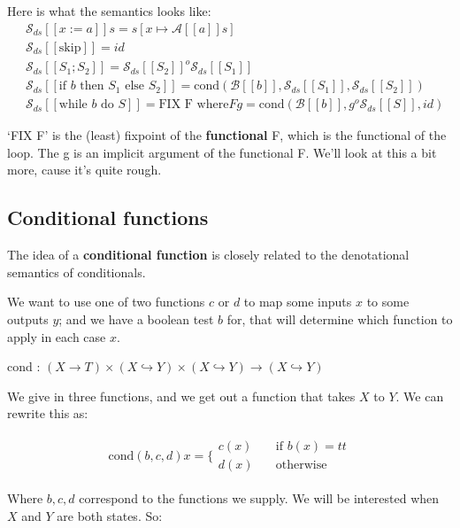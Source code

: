 \documentclass[11pt,a4paper,titlepage,dvipsnames,cmyk]{scrartcl}
\newcommand\pfun{\hookrightarrow}
\begin{document}
Here is what the semantics looks like:
\begin{align*}
    &\mathcal{S}_{ds} [\![x:=a]\!] s = s[x \mapsto \mathcal{A}[\![a]\!]s]
    \\
    &\mathcal{S}_{ds}[\![\text{skip}]\!] = id \\
    &\mathcal{S}_{ds}[\![S_1;S_2]\!] =
    \mathcal{S}_{ds}[\![S_2]\!]^o\mathcal{S}_{ds}[\![S_1]\!] \\
    &\mathcal{S}_{ds}[\![\text{if } b \text{ then } S_1 \text{ else }
    S_2]\!] =
    \text{cond}(\mathcal{B}[\![b]\!],\mathcal{S}_{ds}[\![S_1]\!],\mathcal{S}_{ds}[\![S_2]\!]) \\
    &\mathcal{S}_{ds}[\![\text{while } b \text{ do } S]\!] = \text{FIX F
    where} F g =
    \text{cond}(\mathcal{B}[\![b]\!],g^o\mathcal{S}_{ds}[\![S]\!],id)
\end{align*}

`FIX F' is the (least) fixpoint of the \textbf{functional} F, which is the
functional of the loop. The g is an implicit argument of the functional F.
We'll look at this a bit more, cause it's quite rough.

\subsection{Conditional functions}%
\label{sub:conditional-func}
The idea of a \textbf{conditional function} is closely related to the
denotational semantics of conditionals.

We want to use one of two functions $c$ or $d$ to map some inputs $x$ to
some outputs $y$; and we have a boolean test $b$ for, that will determine
which function to apply in each case $x$.

\begin{center}
cond : $(X \rightarrow T) \times (X \pfun Y) \times (X \pfun Y)
\rightarrow (X \pfun Y)$
\end{center}

We give in three functions, and we get out a function that takes $X$ to
$Y$. We can rewrite this as:

\begin{align*}
    \text{cond}(b,c,d)x = \Bigg \{
        \begin{split}
            c(x) \quad &\text{if } b(x) = tt \\
            d(x) \quad &\text{otherwise}
        \end{split}
\end{align*}

Where $b, c, d$ correspond to the functions we supply. We will be
interested when $X$ and $Y$ are both states. So:
\end{document}
